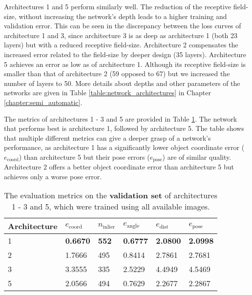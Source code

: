 Architectures 1 and 5 perform similarly well. The reduction of the receptive field-size, without increasing the network's depth leads to a higher training and validation error. This can be seen in the discrepancy between the loss curves of architecture 1 and 3, since architecture 3 is as deep as architecture 1 (both 23 layers) but with a reduced receptive field-size. Architecture 2 compensates the increased error related to the field-size by deeper design (35 layers). Architecture 5 achieves an error as low as of architecture 1. Although its receptive field-size is smaller than that of architecture 2 (59 opposed to 67) but we increased the number of layers to 50. More details about depths and other parameters of the networks are given in Table \ref{table:network_architectures} in Chapter \ref{chapter:semi_automatic}.

The metrics of architectures 1 - 3 and 5 are provided in Table \ref{table:architecture_validation_metrics_comparison}. The network that performs best is architecture 1, followed by architecture 5. The table shows that multiple different metrics can give a deeper grasp of a network's performance, as architecture 1 has a significantly lower object coordinate error ($e_{\text{coord}}$) than architecture 5 but their pose errors ($e_{\text{pose}}$) are of similar quality. Architecture 2 offers a better object coordinate error than architecture 5 but achieves only a worse pose error.

\begin{table}[]
\centering
\begin{tabular}{|l||lllll|} \hline
Architecture & $e_{\text{coord}}$ & $n_{\text{inlier}}$ & $e_{\text{angle}}$ & $e_{\text{dist}}$ & $e_{\text{pose}}$ \\ \hline \hline \rowcolor{Gray}
1            & \textbf{0.6670}             & \textbf{552}                 & \textbf{0.6777}             & \textbf{2.0800}           & \textbf{2.0998}            \\ \hline
2            & 1.7666             & 495                 & 0.8414             & 2.7861            & 2.7681            \\ \hline \rowcolor{Gray}
3            & 3.3555             & 335                 & 2.5229             & 4.4949            & 4.5469            \\ \hline
5            & 2.0566             & 494                 & 0.7629             & 2.2677            & 2.2867 \\ \hline       
\end{tabular}
\caption{The evaluation metrics on the \textbf{validation set} of architectures 1 - 3 and 5, which were trained using all available images.}
\label{table:architecture_validation_metrics_comparison}
\end{table}

